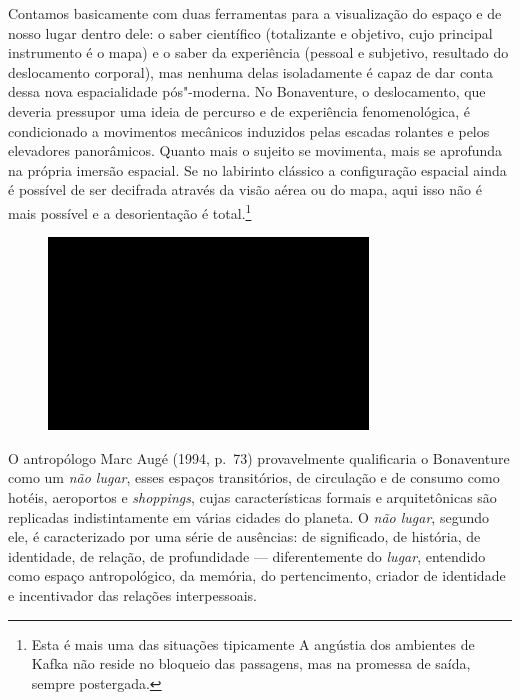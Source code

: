 Contamos basicamente com duas ferramentas para a visualização do espaço
e de nosso lugar dentro dele: o saber científico (totalizante e
objetivo, cujo principal instrumento é o mapa) e o saber da experiência
(pessoal e subjetivo, resultado do deslocamento corporal), mas nenhuma
delas isoladamente é capaz de dar conta dessa nova espacialidade
pós"-moderna. No Bonaventure, o deslocamento, que deveria pressupor uma
ideia de percurso e de experiência fenomenológica, é condicionado a
movimentos mecânicos induzidos pelas escadas rolantes e pelos elevadores
panorâmicos. Quanto mais o sujeito se movimenta, mais se aprofunda na
própria imersão espacial. Se no labirinto clássico a configuração
espacial ainda é possível de ser decifrada através da visão aérea ou do
mapa, aqui isso não é mais possível e a desorientação é total.\footnote{Esta
  é mais uma das situações tipicamente {} A angústia dos
  ambientes de Kafka não reside no bloqueio das passagens, mas na
  promessa de saída, sempre postergada.}

\begin{figure}[!ht]

\centering
 \includegraphics[width=85mm]{./imgs/im1.jpg}
\caption{\tiny{}}

\end{figure}

O antropólogo Marc Augé (1994, p.~73) provavelmente qualificaria o
Bonaventure como um \emph{não lugar}, esses espaços transitórios, de
circulação e de consumo como hotéis, aeroportos e \emph{shoppings},
cujas características formais e arquitetônicas são replicadas
indistintamente em várias cidades do planeta. O \emph{não lugar},
segundo ele, é caracterizado por uma série de ausências: de significado,
de história, de identidade, de relação, de profundidade ---
diferentemente do \emph{lugar}, entendido como espaço antropológico, da
memória, do pertencimento, criador de identidade e incentivador das
relações interpessoais.

